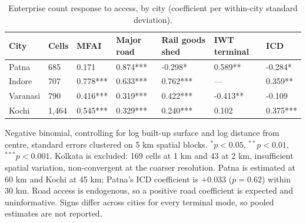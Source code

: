 \begin{table}[htbp]
\centering
\small
\caption{Enterprise count response to access, by city (coefficient per within-city standard deviation).}
\label{tab:t14_agglomeration}
\begin{tabular}{lllllll}
\toprule
City & Cells & MFAI & Major road & Rail goods shed & IWT terminal & ICD \\
\midrule
Patna & 685 & 0.171 & 0.874*** & -0.298* & 0.589** & -0.284* \\
Indore & 707 & 0.778*** & 0.633*** & 0.762*** & — & 0.359** \\
Varanasi & 790 & 0.416*** & 0.319*** & 0.422*** & -0.413** & -0.109 \\
Kochi & 1,464 & 0.545*** & 0.329*** & 0.240*** & 0.102 & 0.375*** \\
\bottomrule
\end{tabular}
\begin{tablenotes}\footnotesize
\item Negative binomial, controlling for log built-up surface and log distance from centre, standard errors clustered on 5 km spatial blocks. $^{*}p<0.05$, $^{**}p<0.01$, $^{***}p<0.001$. Kolkata is excluded: 169 cells at 1 km and 43 at 2 km, insufficient spatial variation, non-convergent at the coarser resolution. Patna is estimated at 60 km and Kochi at 45 km; Patna's ICD coefficient is $+0.033$ ($p=0.62$) within 30 km. Road access is endogenous, so a positive road coefficient is expected and uninformative. Signs differ across cities for every terminal mode, so pooled estimates are not reported.
\end{tablenotes}
\end{table}

